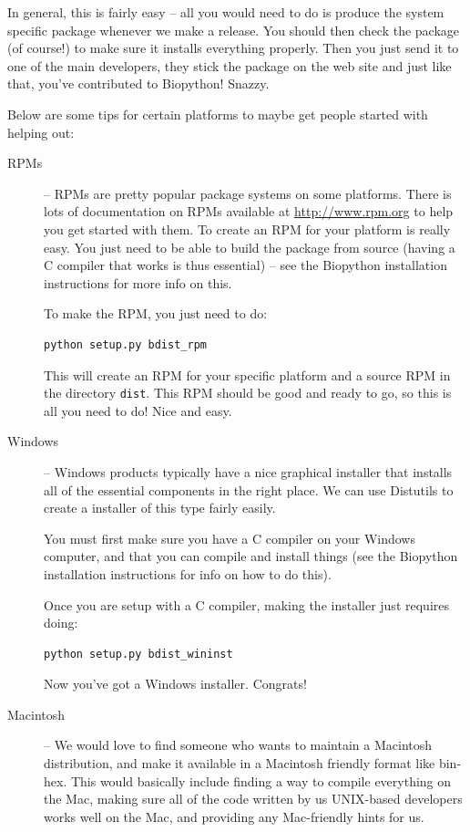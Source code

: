 \documentclass{report}
\begin{document}
In general, this is fairly easy -- all you would need to do is produce the system specific package whenever we make a release. You should then check the package (of course!) to make sure it installs everything properly. Then you just send it to one of the main developers, they stick the package on the web site and just like that, you've contributed to Biopython! Snazzy.

Below are some tips for certain platforms to maybe get people started with helping out:

\begin{description}
  \item[RPMs] -- RPMs are pretty popular package systems on some platforms. There is lots of documentation on RPMs available at \url{http://www.rpm.org} to help you get started with them. To create an RPM for your platform is really easy. You just need to be able to build the package from source (having a C compiler that works is thus essential) -- see the Biopython installation instructions for more info on this.

To make the RPM, you just need to do:

\begin{verbatim}
python setup.py bdist_rpm
\end{verbatim}

This will create an RPM for your specific platform and a source RPM in the directory \verb|dist|. This RPM should be good and ready to go, so this is all you need to do! Nice and easy.

\item[Windows] -- Windows products typically have a nice graphical installer that installs all of the essential components in the right place. We can use Distutils to create a installer of this type fairly easily.

You must first make sure you have a C compiler on your Windows computer, and that you can compile and install things (see the Biopython installation instructions for info on how to do this).

Once you are setup with a C compiler, making the installer just requires doing:

\begin{verbatim}
python setup.py bdist_wininst
\end{verbatim}

Now you've got a Windows installer. Congrats!

\item[Macintosh] -- We would love to find someone who wants to maintain a Macintosh distribution, and make it available in a Macintosh friendly format like bin-hex. This would basically include finding a way to compile everything on the Mac, making sure all of the code written by us UNIX-based developers works well on the Mac, and providing any Mac-friendly hints for us.

\end{description}
\end{document}
